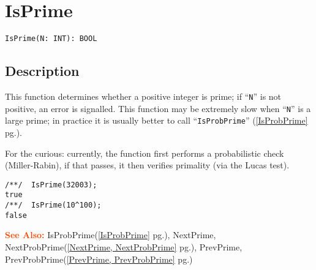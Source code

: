 \documentclass[a4paper]{mybook}
\newenvironment{command}{}{} %
\newcommand\SeeAlso{\par\textcolor{OrangeRed}{\textbf{\large See Also: }}}
\begin{document}
\section{IsPrime}
\label{IsPrime}
\begin{command} %


\begin{Verbatim}[label=syntax, rulecolor=\color{MidnightBlue},
frame=single]
IsPrime(N: INT): BOOL
\end{Verbatim}


\subsection*{Description}

This function determines whether a positive integer is prime; if ``\verb&N&''
is not positive, an error is signalled.  This function may be extremely
slow when ``\verb&N&'' is a large prime; in practice it is usually
better to call ``\verb&IsProbPrime&'' (\ref{IsProbPrime} pg.\pageref{IsProbPrime}).
\par 
For the curious: currently, the function first performs a probabilistic
check (Miller-Rabin), if that passes, it then verifies primality (via
the Lucas test).
\begin{Verbatim}[label=example, rulecolor=\color{PineGreen}, frame=single]
/**/  IsPrime(32003);
true
/**/  IsPrime(10^100);
false
\end{Verbatim}


\SeeAlso %
  IsProbPrime(\ref{IsProbPrime} pg.\pageref{IsProbPrime}), 
    NextPrime, NextProbPrime(\ref{NextPrime, NextProbPrime} pg.\pageref{NextPrime, NextProbPrime}), 
    PrevPrime, PrevProbPrime(\ref{PrevPrime, PrevProbPrime} pg.\pageref{PrevPrime, PrevProbPrime})
\end{command} %
\end{document}
